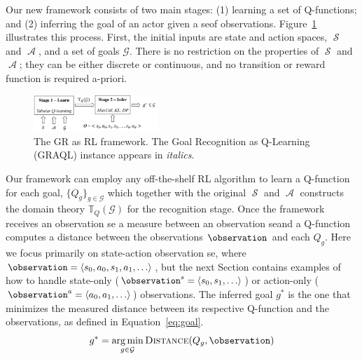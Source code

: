 \documentclass[letterpaper]{article}
\DeclareMathOperator{\statespace}{\mathcal{S}}
\DeclareMathOperator{\actionspace}{\mathcal{A}}
\DeclareMathOperator*{\argmin}{arg\,min}
\providecommand\theory{\mathbb{T}}
\providecommand\goals{\mathcal{G}}
\begin{document}
Our new framework consists of two main stages: (1) learning a set of Q-functions; and (2) inferring the goal of an actor given a seof observations.
Figure~\ref{fig:RL4GR} illustrates this process.
First, the initial inputs are state and action spaces, $\statespace$ and $\actionspace$, and a set of goals $\goals$.
%
There is no restriction on the properties of $\statespace$ and $\actionspace$; they can be either discrete or continuous, and no transition or reward function is required a-priori. %
%
\begin{figure}[t]
    \centering
    \includegraphics[width=0.42\textwidth]{Figures/RL4GR.pdf}
    \caption{The GR as RL framework. The Goal Recognition as Q-Learning (GRAQL) instance appears in \textit{italics}.}
    \label{fig:RL4GR}
\end{figure}
%
Our framework can employ any off-the-shelf RL algorithm to learn a Q-function for each goal, $\{Q_g\}_{g \in \goals}$ which together with the original $\statespace$ and $\actionspace$ constructs the domain theory $\theory_{Q}(\goals)$ for the recognition stage.
Once the framework receives an observation se a measure between an observation seand a Q-function computes a distance between the observations $\observation$ and each $Q_g$.
Here we focus primarily on state-action observation se, where $\observation = \langle s_0, a_0, s_1, a_1, \ldots \rangle$, but the next Section contains examples of how to handle state-only ($\observation^s = \langle s_0, s_1,\ldots \rangle$) or action-only ($\observation^a = \langle a_0, a_1,\ldots \rangle$) observations.
The inferred goal $g^*$ is the one that minimizes the measured distance between its respective Q-function and the observations, as defined in Equation~\ref{eq:goal}.
%
%
\begin{equation}
\label{eq:goal}
    g^* = \argmin_{g \in \goals} {\textsc{Distance}(Q_g, \observation)}
\end{equation}
\end{document}
